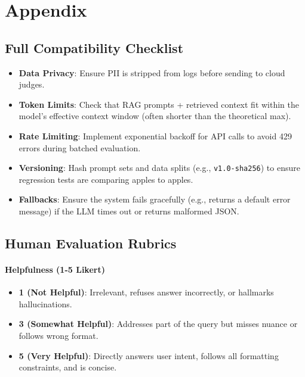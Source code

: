 \appendix
\section{Appendix}
\label{sec:appendix}

\subsection{Full Compatibility Checklist}
\label{app:checklists}

\begin{itemize}
    \item \textbf{Data Privacy}: Ensure PII is stripped from logs before sending to cloud judges.
    \item \textbf{Token Limits}: Check that RAG prompts + retrieved context fit within the model's effective context window (often shorter than the theoretical max).
    \item \textbf{Rate Limiting}: Implement exponential backoff for API calls to avoid 429 errors during batched evaluation.
    \item \textbf{Versioning}: Hash prompt sets and data splits (e.g., \texttt{v1.0-sha256}) to ensure regression tests are comparing apples to apples.
    \item \textbf{Fallbacks}: Ensure the system fails gracefully (e.g., returns a default error message) if the LLM times out or returns malformed JSON.
\end{itemize}

\subsection{Human Evaluation Rubrics}
\label{app:rubrics}

\paragraph{Helpfulness (1-5 Likert)}
\begin{itemize}
    \item \textbf{1 (Not Helpful)}: Irrelevant, refuses answer incorrectly, or hallmarks hallucinations.
    \item \textbf{3 (Somewhat Helpful)}: Addresses part of the query but misses nuance or follows wrong format.
    \item \textbf{5 (Very Helpful)}: Directly answers user intent, follows all formatting constraints, and is concise.
\end{itemize}

